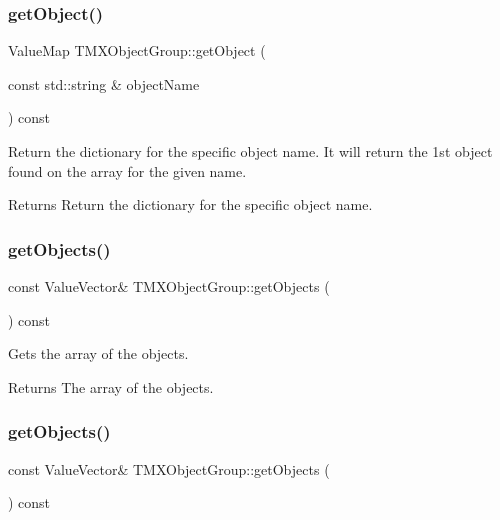 \subsubsection{\texorpdfstring{get\+Object()}{getObject()}\hspace{0.1cm}{\footnotesize\ttfamily [2/2]}}
{\footnotesize\ttfamily Value\+Map T\+M\+X\+Object\+Group\+::get\+Object (\begin{DoxyParamCaption}\item[{const std\+::string \&}]{object\+Name }\end{DoxyParamCaption}) const}

Return the dictionary for the specific object name. It will return the 1st object found on the array for the given name.

\begin{DoxyReturn}{Returns}
Return the dictionary for the specific object name. 
\end{DoxyReturn}
\mbox{\label{classTMXObjectGroup_a643c72fe79aabd06d076597a7f8aeefd}} 
\subsubsection{\texorpdfstring{get\+Objects()}{getObjects()}\hspace{0.1cm}{\footnotesize\ttfamily [1/2]}}
{\footnotesize\ttfamily const Value\+Vector\& T\+M\+X\+Object\+Group\+::get\+Objects (\begin{DoxyParamCaption}{ }\end{DoxyParamCaption}) const\hspace{0.3cm}{\ttfamily [inline]}}

Gets the array of the objects.

\begin{DoxyReturn}{Returns}
The array of the objects. 
\end{DoxyReturn}
\mbox{\label{classTMXObjectGroup_a643c72fe79aabd06d076597a7f8aeefd}} 
\subsubsection{\texorpdfstring{get\+Objects()}{getObjects()}\hspace{0.1cm}{\footnotesize\ttfamily [2/2]}}
{\footnotesize\ttfamily const Value\+Vector\& T\+M\+X\+Object\+Group\+::get\+Objects (\begin{DoxyParamCaption}{ }\end{DoxyParamCaption}) const\hspace{0.3cm}{\ttfamily [inline]}}

